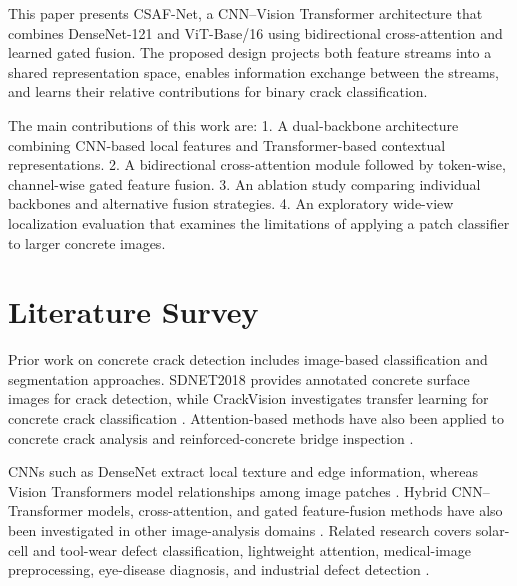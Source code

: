 \documentclass[12pt,a4paper,oneside]{article}
\begin{document}
This paper presents CSAF-Net, a CNN–Vision Transformer architecture that combines DenseNet-121 and ViT-Base/16 using bidirectional cross-attention and learned gated fusion. The proposed design projects both feature streams into a shared representation space, enables information exchange between the streams, and learns their relative contributions for binary crack classification.

The main contributions of this work are:
1. A dual-backbone architecture combining CNN-based local features and Transformer-based contextual representations.
2. A bidirectional cross-attention module followed by token-wise, channel-wise gated feature fusion.
3. An ablation study comparing individual backbones and alternative fusion strategies.
4. An exploratory wide-view localization evaluation that examines the limitations of applying a patch classifier to larger concrete images.



\section{Literature Survey}

Prior work on concrete crack detection includes image-based classification and segmentation approaches. SDNET2018 provides annotated concrete surface images for crack detection, while CrackVision investigates transfer learning for concrete crack classification \cite{sdnet2018,crackvision2025}. Attention-based methods have also been applied to concrete crack analysis and reinforced-concrete bridge inspection \cite{sarhadi2024,ruggieri2025}.

CNNs such as DenseNet extract local texture and edge information, whereas Vision Transformers model relationships among image patches \cite{densenet2017,vit2021,vaswani2017}. Hybrid CNN--Transformer models, cross-attention, and gated feature-fusion methods have also been investigated in other image-analysis domains \cite{effresnetvit2025,hussain2024,hajian2025,lee2025}. Related research covers solar-cell and tool-wear defect classification, lightweight attention, medical-image preprocessing, eye-disease diagnosis, and industrial defect detection \cite{abdelsattar2025,feng2025,alnamoly2024,rashid2025,eisentraut2025,zhang2025,rieck2025,lu2022}.

\end{document}
